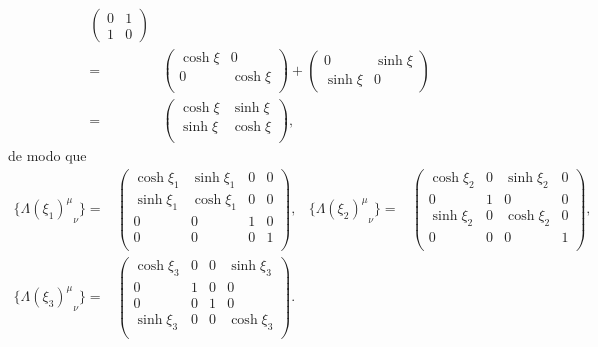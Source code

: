 \begin{frame}
\begin{align}
\begin{pmatrix}
  0 & 1 \\
  1 & 0
\end{pmatrix} 
\nonumber\\
  =&
  \begin{pmatrix}
    \cosh\xi & 0\\
    0 & \cosh\xi \\
  \end{pmatrix}
+
\begin{pmatrix}
  0 & \sinh\xi \\
  \sinh\xi & 0
\end{pmatrix}
\nonumber\\
    =&
  \begin{pmatrix}
    \cosh\xi & \sinh\xi\\
     \sinh\xi& \cosh\xi \\
  \end{pmatrix},
\end{align}
de modo que
\begin{align}
  \label{eq:Lximunu}
  \{{\Lambda(\xi_1)^{\mu}}_{\nu}\}=&
    \begin{pmatrix}
    \cosh\xi_1 & \sinh\xi_1 & 0  & 0\\
    \sinh\xi_1 & \cosh\xi_1 & 0  & 0\\
     0       &   0      & 1  & 0\\
     0       &   0      & 0  & 1\\
  \end{pmatrix},&
  \{{\Lambda(\xi_2)^{\mu}}_{\nu}\}=&
    \begin{pmatrix}
    \cosh\xi_2 & 0 & \sinh\xi_2  & 0\\
            0  & 1 & 0           & 0\\
     \sinh\xi_2&   0      & \cosh\xi_2  & 0\\
     0       &   0      & 0  & 1\\
  \end{pmatrix}, \nonumber\\
 \{{\Lambda(\xi_3)^{\mu}}_{\nu}\}=&
    \begin{pmatrix}
    \cosh\xi_3 & 0 & 0  & \sinh\xi_3\\
            0  & 1 & 0           & 0\\
          0 &   0      & 1  & 0\\
     \sinh\xi_3      &   0      & 0  & \cosh\xi_3\\
  \end{pmatrix}. &&
\end{align}



\end{frame}
